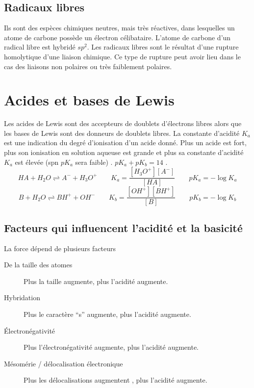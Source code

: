 \subsection{Radicaux libres}
Ils sont des espèces chimiques neutres, mais très réactives, dans lesquelles un atome de carbone possède un électron célibataire.
L'atome de carbone d'un radical libre est hybridé $sp^2$.
Les radicaux libres sont le résultat
d'une rupture homolytique d'une liaison chimique.
Ce type de rupture peut avoir lieu dans le cas des liaisons non polaires ou très faiblement polaires.
\section{Acides et bases de Lewis}

Les acides de Lewis sont des accepteurs de doublets d'électrons libres alors que les bases de Lewis sont des donneurs de doublets libres.
La constante d'acidité $K_a$ est une indication du degré d'ionisation d'un acide donné.
Plus un acide est fort, plus son ionisation en solution aqueuse est grande et plus sa constante d'acidité $K_a$ est élevée (spn $pK_a$ sera faible) .
$pK_a + pK_b = 14 $ .
$$ HA + H_2O \rightleftharpoons A^- + H_3O^+ \,\,\,\,\,\,\,\,\,\,\,\, K_a = \frac{[H_3O^+][A^-]}{[HA]} \,\,\,\,\,\,\,\,\,\,\,\, pK_a = -\log K_a $$
$$ B + H_2O \rightleftharpoons BH^+ + OH^- \,\,\,\,\,\,\,\,\,\,\,\, K_b = \frac{[OH^+][BH^+]}{[B]} \,\,\,\,\,\,\,\,\,\,\,\, pK_b = -\log K_b $$
\subsection{Facteurs qui influencent l'acidité et la basicité}

La force dépend de plusieurs facteurs
\begin{description}
  \item[De la taille des atomes]

    Plus la taille augmente, plus l'acidité augmente.
  \item[Hybridation]

    Plus le caractère ``s'' augmente, plus l'acidité augmente.
  \item[\'Electronégativité]

    Plus l'électronégativité augmente, plus l'acidité augmente.
  \item[Mésomérie / délocalisation électronique]

    Plus les délocalisations augmentent , plus l'acidité augmente.
\end{description}


